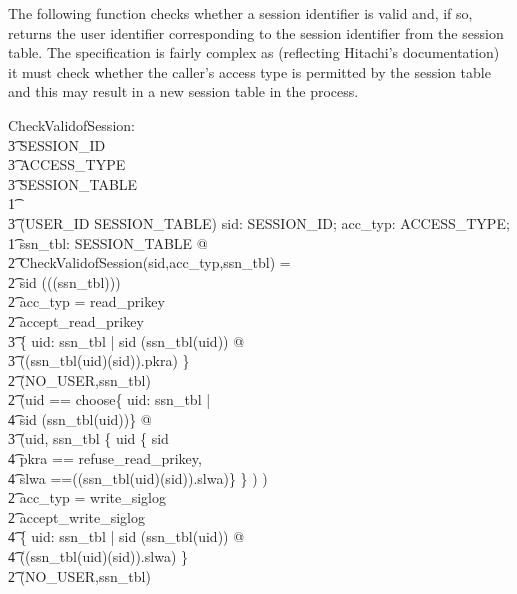 \documentclass[a4paper,pdftex]{article}
\begin{document}
The following function checks whether a session identifier is valid
and, if so, returns the user identifier corresponding to the session identifier
from the session table.  The specification is fairly complex as
(reflecting Hitachi's documentation) it must check whether the
caller's access type is permitted by the session table
and this may result in a new session table in the process.

\begin{axdef}
CheckValidofSession: \\
\t3 SESSION\_ID \cross \\
\t3 ACCESS\_TYPE \cross \\
\t3 SESSION\_TABLE \\
\t1 \fun \\
\t3 (USER\_ID \cross SESSION\_TABLE)
\where
\forall sid: SESSION\_ID; acc\_typ: ACCESS\_TYPE; \\
\t1 ssn\_tbl: SESSION\_TABLE @ \\
\t2   CheckValidofSession(sid,acc\_typ,ssn\_tbl) = \\
\t2   \IF sid \in \dom (\bigcup (\ran (ssn\_tbl))) \\
\t2   \THEN \IF acc\_typ = read\_prikey \\
\t2   \THEN \IF accept\_read\_prikey \notin \\
\t3     \{ uid: \dom ssn\_tbl | sid \in \dom (ssn\_tbl(uid)) @ \\
\t3     ((ssn\_tbl(uid)(sid)).pkra) \} \\
\t2   \THEN  (NO\_USER,ssn\_tbl) \\
\t2   \ELSE (\LET uid == choose\{ uid: \dom ssn\_tbl | \\
\t4                       sid \in \dom (ssn\_tbl(uid))\} @ \\
\t3     (uid, ssn\_tbl \oplus \{ uid \mapsto \{ sid \mapsto \\
\t4     \lbind pkra == refuse\_read\_prikey,\\
\t4            slwa ==((ssn\_tbl(uid)(sid)).slwa)\rbind \} \} ) ) \\
\t2   \ELSE \IF acc\_typ = write\_siglog \\
\t2   \THEN \IF  accept\_write\_siglog \notin \\
\t4     \{ uid: \dom ssn\_tbl | sid \in \dom (ssn\_tbl(uid)) @ \\
\t4     ((ssn\_tbl(uid)(sid)).slwa) \} \\
\t2   \THEN  (NO\_USER,ssn\_tbl) \\

\end{axdef}
\end{document}
